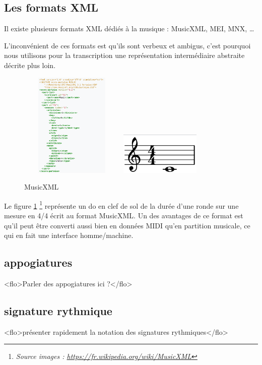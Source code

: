 \subsection*{Les formats XML}
Il existe plusieurs formats XML dédiés à la musique : MusicXML, MEI, MNX, …

L’inconvénient de ces formats est qu’ils sont verbeux et ambigus, c’est
pourquoi nous utilisons pour la transcription une représentation intermédiaire
abstraite décrite plus loin.


\begin{figure}[h]
	\centering
	\includegraphics[height=50mm, width=50mm]{
    z_images/1_contexte/6_musicxml_0.png}
    \includegraphics[height=20mm, width=40mm]{
    z_images/1_contexte/6_musicxml_1.png}
	\caption{MusicXML} 
	\label{MusicXML}
\end{figure}

Le figure \ref{MusicXML}
\footnote{\textit{Source images :
\url{https://fr.wikipedia.org/wiki/MusicXML}}}
représente un do en clef de sol de la durée d’une ronde sur une mesure en 4/4
écrit au format MusicXML.
Un des avantages de ce format est qu’il peut être converti aussi bien en
données MIDI qu’en partition musicale, ce qui en fait une interface
homme/machine.

\subsection*{appogiatures}
<flo>Parler des appogiatures ici ?</flo>
\subsection*{signature rythmique}
<flo>présenter rapidement la notation des signatures rythmiques</flo>

